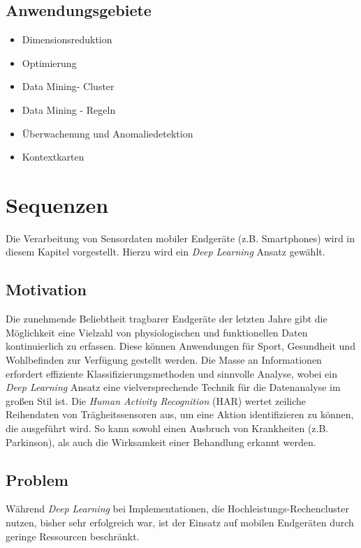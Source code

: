 \documentclass[11pt]{article}
\begin{document}
    \subsection{Anwendungsgebiete}
    \begin{itemize}
        \item Dimensionsreduktion
        \item Optimierung
        \item Data Mining- Cluster
        \item Data Mining - Regeln
        \item Überwachenung und Anomaliedetektion
        \item Kontextkarten
    \end{itemize}

    \section{Sequenzen}
    Die Verarbeitung von Sensordaten mobiler Endgeräte (z.B. Smartphones) wird in diesem Kapitel
    vorgestellt. Hierzu wird ein \textit{Deep Learning} Ansatz gewählt.

    \subsection{Motivation}
    Die zunehmende Beliebtheit tragbarer Endgeräte der letzten Jahre
    gibt die Möglichkeit eine Vielzahl von physiologischen und funktionellen Daten kontinuierlich
    zu erfassen. Diese können Anwendungen für Sport, Gesundheit und Wohlbefinden zur Verfügung
    gestellt werden. Die Masse an Informationen erfordert effiziente Klassifizierungsmethoden und
    sinnvolle Analyse, wobei ein \textit{Deep Learning} Ansatz eine vielversprechende Technik für
    die Datenanalyse im großen Stil ist. Die \textit{Human Activity Recognition} (HAR) wertet
    zeiliche Reihendaten von Trägheitssensoren aus, um eine Aktion  identifizieren
    zu können, die ausgeführt wird. So kann sowohl einen Ausbruch von Krankheiten (z.B. Parkinson),
    als auch die Wirksamkeit einer Behandlung erkannt werden.

    \subsection{Problem}
    Während \textit{Deep Learning} bei Implementationen, die Hochleistungs-Rechencluster nutzen,
    bisher sehr erfolgreich war, ist der Einsatz auf mobilen Endgeräten durch geringe Ressourcen
    beschränkt.
\end{document}

